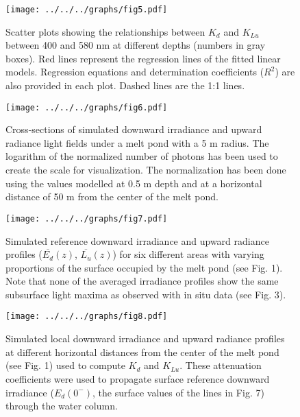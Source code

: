 \documentclass[12pt,a4paper]{scrartcl}
\newcommand{\ked}{\ensuremath{K_{d}}}
\newcommand{\klu}{\ensuremath{K_{Lu}}}
\newcommand{\edzero}{\ensuremath{{E_d(0^-)}}}
\newcommand{\meanedz}{\ensuremath{{\overline{E_d}(z)}}}
\newcommand{\meanluz}{\ensuremath{{\overline{L_u}(z)}}}
\begin{document}
\clearpage
\newpage

\begin{figure}[ht]
	\centering
	\texttt{[image: ../../../graphs/fig5.pdf]}
	\caption{Scatter plots showing the relationships between \ked{} and \klu{} between 400 and 580 nm at different depths (numbers in gray boxes). Red lines represent the regression lines of the fitted linear models. Regression equations and determination coefficients ($R^2$) are also provided in each plot. Dashed lines are the 1:1 lines.}
\end{figure}

\clearpage
\newpage

\begin{figure}[ht]
	\centering
	\texttt{[image: ../../../graphs/fig6.pdf]}
	\caption{Cross-sections of simulated downward irradiance and upward radiance light fields under a melt pond with a 5 m radius. The logarithm of the normalized number of photons has been used to create the scale for visualization. The normalization has been done using the values modelled at 0.5 m depth and at a horizontal distance of 50 m from the center of the melt pond.}
\end{figure}

\clearpage
\newpage

\begin{figure}[h]
	\centering
	\texttt{[image: ../../../graphs/fig7.pdf]}
	\caption{Simulated reference downward irradiance and upward radiance profiles (\meanedz{}, \meanluz{}) for six different areas with varying proportions of the surface occupied by the melt pond (see Fig. 1). Note that none of the averaged irradiance profiles show the same subsurface light maxima as observed with in situ data (see Fig. 3).}
\end{figure}

\clearpage
\newpage

\begin{figure}[ht]
	\centering
	\texttt{[image: ../../../graphs/fig8.pdf]}
	\caption{Simulated local downward irradiance and upward radiance profiles at different horizontal distances from the center of the melt pond (see Fig. 1) used to compute \ked{} and \klu{}. These attenuation coefficients were used to propagate surface reference downward irradiance (\edzero{}, the surface values of the lines in Fig. 7) through the water column.}
\end{figure}

\clearpage
\newpage
\end{document}

